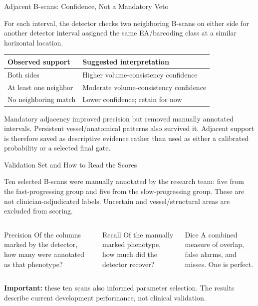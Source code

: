 \documentclass[aspectratio=169]{beamer}
\begin{document}
\begin{frame}{Adjacent B-scans: Confidence, Not a Mandatory Veto}

For each interval, the detector checks two neighboring B-scans on either side
for another detector interval assigned the same EA/barcoding class at a similar
horizontal location.

\begin{center}
\begin{tabular}{ll}
\toprule
\textbf{Observed support} & \textbf{Suggested interpretation} \\
\midrule
Both sides & Higher volume-consistency confidence \\
At least one neighbor & Moderate volume-consistency confidence \\
No neighboring match & Lower confidence; retain for now \\
\bottomrule
\end{tabular}
\end{center}

Mandatory adjacency improved precision but removed manually annotated
intervals. Persistent vessel/anatomical patterns also survived it. Adjacent
support is therefore saved as descriptive evidence rather than used as either
a calibrated probability or a selected final gate.

\end{frame}

\begin{frame}{Validation Set and How to Read the Scores}

Ten selected B-scans were manually annotated by the research team: five from
the fast-progressing group and five from the slow-progressing group. These are
not clinician-adjudicated labels. Uncertain and vessel/structural areas are
excluded from scoring.

\begin{columns}[T]
\begin{block}{Precision}
Of the columns marked by the detector, how many were annotated as that
phenotype?
\end{block}
\begin{block}{Recall}
Of the manually marked phenotype, how much did the detector recover?
\end{block}
\begin{block}{Dice}
A combined measure of overlap, false alarms, and misses. One is perfect.
\end{block}
\end{columns}

\vspace{0.3cm}
\textbf{Important:} these ten scans also informed parameter selection. The
results describe current development performance, not clinical validation.

\end{frame}
\end{document}
